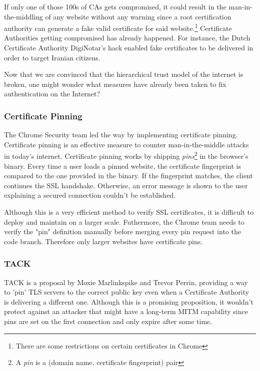 \documentclass{vldb}
\begin{document}
If only one of those 100s of CAs gets compromised, it could result in the man-in-the-middling of any website without any warning since a root certification authority can generate a fake valid certificate for said website.\footnote{There are some restrictions on certain certificates in Chrome}
Certificate Authorities getting compromised has already happened. For instance, the Dutch Certificate Authority DigiNotar's hack \cite{diginotarHack} enabled fake certificates to be delivered in order to target Iranian citizens.

Now that we are convinced that the hierarchical trust model of the internet is broken, one might wonder what measures have already been taken to fix authentication on the Internet?

\subsubsection{Certificate Pinning}

The Chrome Security team led the way by implementing certificate pinning. Certificate pinning is an effective measure to counter man-in-the-middle attacks in today's internet. Certificate pinning works by shipping \emph{pins}\footnote{A \emph{pin} is a (domain name, certificate fingerprint) pair} in the browser's binary.\cite{chromiumPins} Every time a user loads a pinned website, the certificate fingerprint is compared to the one provided in the binary. If the fingerprint matches, the client continues the SSL handshake. Otherwise, an error message is shown to the user explaining a secured connection couldn't be established.

Although this is a very efficient method to verify SSL certificates, it is difficult to deploy and maintain on a larger scale. Futhermore, the Chrome team needs to verify the "pin" definition manually before merging every pin request into the code branch. Therefore only larger websites have certificate pins.

\subsubsection{TACK}

TACK is a proposal by Moxie Marlinkspike and Trevor Perrin, providing a way to 'pin' TLS servers to the correct public key even when a Certificate Authority is delivering a different one. Although this is a promising proposition, it wouldn't protect against an attacker that might have a long-term MITM capability since pins are set on the first connection and only expire after some time.\cite{tackMITM}
\end{document}
